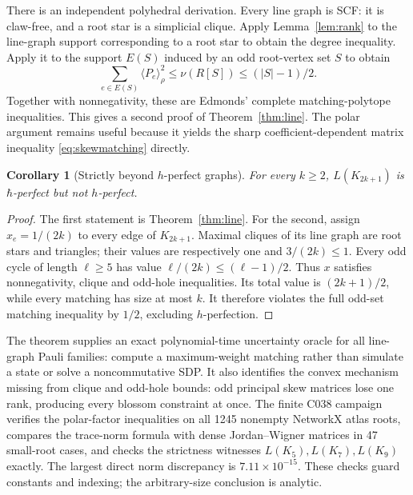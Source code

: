 \documentclass[11pt,a4paper]{article}
\newtheorem{corollary}[theorem]{Corollary}
\theoremstyle{remark}\newtheorem{remark}[theorem]{Remark}
\newcommand{\ev}[1]{\langle#1\rangle_\rho}
\begin{document}
There is an independent polyhedral derivation. Every line graph is SCF:
it is claw-free, and a root star is a simplicial clique. Apply
Lemma~\ref{lem:rank} to the line-graph support corresponding to a root star
to obtain the degree inequality. Apply it to the support $E(S)$ induced by
an odd root-vertex set $S$ to obtain
\[
 \sum_{e\in E(S)}\ev{P_e}^2\leq\nu(R[S])\leq (|S|-1)/2.
\]
Together with nonnegativity, these are Edmonds' complete
matching-polytope inequalities. This gives a second proof of
Theorem~\ref{thm:line}. The polar argument remains useful because it yields
the sharp coefficient-dependent matrix inequality \eqref{eq:skewmatching}
directly.

\begin{corollary}[Strictly beyond $h$-perfect graphs]\label{cor:strict}
For every $k\geq2$, $L(K_{2k+1})$ is $\hbar$-perfect but not
$h$-perfect.
\end{corollary}
\begin{proof}
The first statement is Theorem~\ref{thm:line}. For the second, assign
$x_e=1/(2k)$ to every edge of $K_{2k+1}$. Maximal cliques of its line
graph are root stars and triangles; their values are respectively one
and $3/(2k)\leq1$. Every odd cycle of length $\ell\geq5$ has value
$\ell/(2k)\leq(\ell-1)/2$. Thus $x$ satisfies nonnegativity, clique
and odd-hole inequalities. Its total value is $(2k+1)/2$, while every
matching has size at most $k$. It therefore violates the full odd-set
matching inequality by $1/2$, excluding $h$-perfection.
\end{proof}

The theorem supplies an exact polynomial-time uncertainty oracle for all
line-graph Pauli families: compute a maximum-weight matching rather than
simulate a state or solve a noncommutative SDP. It also identifies the
convex mechanism missing from clique and odd-hole bounds: odd principal
skew matrices lose one rank, producing every blossom constraint at once.
The finite C038 campaign verifies the polar-factor inequalities on all
1245 nonempty NetworkX atlas roots, compares the trace-norm formula with
dense Jordan--Wigner matrices in 47 small-root cases, and checks the
strictness witnesses $L(K_5),L(K_7),L(K_9)$ exactly. The largest direct
norm discrepancy is $7.11\times10^{-15}$. These checks guard constants and
indexing; the arbitrary-size conclusion is analytic.
\end{document}
